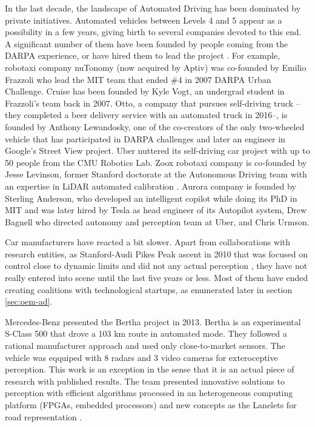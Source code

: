 In the last decade, the landscape of Automated Driving has been dominated
by private initiatives. Automated vehicles between Levels 4 and 5 appear
as a possibility in a few years, giving birth to several companies devoted to 
this end. 
A significant number of them have been founded by people coming from the 
DARPA experience, or have hired them to lead the project 
\cite{Chapell2016}.
 For
example, robotaxi company nuTonomy (now acquired by Aptiv) was co-founded
by Emilio Frazzoli who lead the MIT team that ended \#4 in 2007 DARPA 
Urban Challenge.
Cruise has been founded by Kyle Vogt, an undergrad student in
Frazzoli's team back in 2007. Otto, a company that pursues self-driving 
truck --they completed a beer delivery service with an automated truck 
in 2016--, is founded by Anthony Lewandosky, one of the co-creators of
the only two-wheeled vehicle that has participated in DARPA challenges
and later an engineer in Google's Street View project.
Uber nuttered its self-driving car project with up to 50 people from the CMU
Robotics Lab.
Zoox robotaxi company is co-founded by Jesse Levinson, former Stanford doctorate
at the Autonomous Driving team with an expertise in LiDAR automated calibration
\cite{Levinson2011a}.
Aurora company is founded by Sterling Anderson, who developed an intelligent 
copilot \cite{Anderson2013} while doing its PhD in MIT and was later hired by
Tesla as head engineer of its Autopilot system, Drew Bagnell who directed 
autonomy and perception team at Uber, and Chris Urmson.

Car manufacturers have reacted a bit slower. Apart from collaborations with
research entities, as Stanford-Audi Pikes Peak ascent in 2010 that was
focused on control close to dynamic limits and did not any actual perception
\cite{Funke2012}, 
they have not really entered into scene until the last five years or less. 
Most of them have ended creating coalitions with technological startups, as 
enumerated later in section \ref{sec:oem-ad}.

Mercedes-Benz presented the Bertha project in 2013. Bertha is an experimental
S-Class 500 that drove a 103 km route in automated mode. They followed a
rational manufacturer approach and used only close-to-market sensors.
The vehicle was eqquiped with 8 radars and 3 video cameras for exteroceptive 
perception.
This work is an exception in the sense that it is an actual piece of research
with published results. The team presented innovative solutions to perception 
\cite{Bender2014} with efficient algorithms processed in an heterogeneous 
computing platform (FPGAs, embedded processors) and new concepts as the 
Lanelets for road representation \cite{Ziegler2014}.

